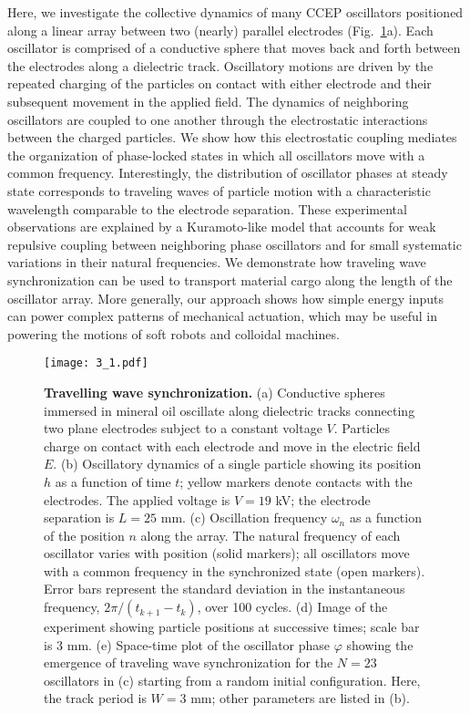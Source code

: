 Here, we investigate the collective dynamics of many CCEP oscillators positioned along a linear array between two (nearly) parallel electrodes (Fig.~\ref{fig:1}a). Each oscillator is comprised of a conductive sphere that moves back and forth between the electrodes along a dielectric track.  Oscillatory motions are driven by the repeated charging of the particles on contact with either electrode and their subsequent movement in the applied field. The dynamics of neighboring oscillators are coupled to one another through the electrostatic interactions between the charged particles. We show how this electrostatic coupling mediates the organization of phase-locked states in which all oscillators move with a common frequency. Interestingly, the distribution of oscillator phases at steady state corresponds to traveling waves of particle motion with a characteristic wavelength comparable to the electrode separation. These experimental observations are explained by a Kuramoto-like model\autocite{Acebron2005,Tsimring2005} that accounts for weak repulsive coupling between neighboring phase oscillators and for small systematic variations in their natural frequencies. We demonstrate how traveling wave synchronization can be used to transport material cargo along the length of the oscillator array. More generally, our approach shows how simple energy inputs can power complex patterns of mechanical actuation, which may be useful in powering the motions of soft robots\autocite{rus2015design, acome2018hydraulically} and colloidal machines\autocite{Snezhko2011,Yan2012, Martinez-Pedrero2015, goodrich2017using, Driscoll2017}.

\begin{figure}[p!]
    \centering
    \texttt{[image: 3\_1.pdf]}
    \caption{\textbf{Travelling wave synchronization.} (a) Conductive spheres immersed in mineral oil oscillate along dielectric tracks connecting two plane electrodes subject to a constant voltage $V$. Particles charge on contact with each electrode and move in the electric field $E$. (b) Oscillatory dynamics of a single particle showing its position $h$  as a function of time $t$; yellow markers denote contacts with the electrodes. The applied voltage is $V=19$ kV; the electrode separation is $L=25$ mm. (c) Oscillation frequency $\omega_n$ as a function of the position $n$ along the array. The natural frequency of each oscillator varies with position (solid markers); all oscillators move with a common frequency in the synchronized state (open markers). Error bars represent the standard deviation in the instantaneous frequency, $2\pi/(t_{k+1}-t_k)$, over 100 cycles. (d) Image of the experiment showing particle positions at successive times; scale bar is 3 mm. (e) Space-time plot of the oscillator phase $\varphi$ showing the emergence of traveling wave synchronization for the $N=23$ oscillators in (c) starting from a random initial configuration.  Here, the track period is $W=3$ mm; other parameters are listed in (b).}
    \label{fig:1}
\end{figure}


